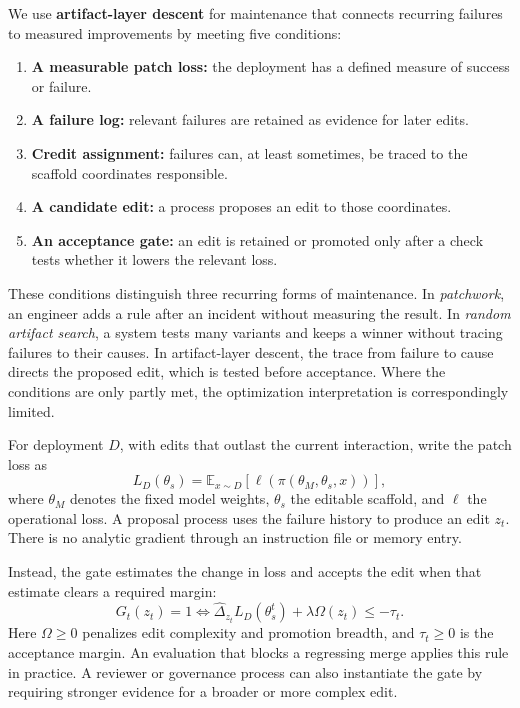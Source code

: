 \documentclass[
  11pt,
]{article}
\providecommand{\tightlist}{%
  \setlength{\itemsep}{0pt}\setlength{\parskip}{0pt}}
\begin{document}
We use \textbf{artifact-layer descent} for maintenance that connects recurring failures to measured improvements by meeting five conditions:

\begin{enumerate}
\def\labelenumi{\arabic{enumi}.}
\tightlist
\item
  \textbf{A measurable patch loss:} the deployment has a defined measure of success or failure.
\item
  \textbf{A failure log:} relevant failures are retained as evidence for later edits.
\item
  \textbf{Credit assignment:} failures can, at least sometimes, be traced to the scaffold coordinates responsible.
\item
  \textbf{A candidate edit:} a process proposes an edit to those coordinates.
\item
  \textbf{An acceptance gate:} an edit is retained or promoted only after a check tests whether it lowers the relevant loss.
\end{enumerate}

These conditions distinguish three recurring forms of maintenance. In \emph{patchwork}, an engineer adds a rule after an incident without measuring the result. In \emph{random artifact search}, a system tests many variants and keeps a winner without tracing failures to their causes. In artifact-layer descent, the trace from failure to cause directs the proposed edit, which is tested before acceptance. Where the conditions are only partly met, the optimization interpretation is correspondingly limited.

For deployment \(D\), with edits that outlast the current interaction, write the patch loss as \[L_D(\theta_s)=\mathbb{E}_{x\sim D}\!\left[\ell(\pi(\theta_M,\theta_s,x))\right],\] where \(\theta_M\) denotes the fixed model weights, \(\theta_s\) the editable scaffold, and \(\ell\) the operational loss. A proposal process uses the failure history to produce an edit \(z_t\). There is no analytic gradient through an instruction file or memory entry.

Instead, the gate estimates the change in loss and accepts the edit when that estimate clears a required margin: \[G_t(z_t)=1\iff\widehat{\Delta}_{z_t}L_D(\theta_s^t)+\lambda\Omega(z_t)\leq-\tau_t.\] Here \(\Omega\geq0\) penalizes edit complexity and promotion breadth, and \(\tau_t\geq0\) is the acceptance margin. An evaluation that blocks a regressing merge applies this rule in practice. A reviewer or governance process can also instantiate the gate by requiring stronger evidence for a broader or more complex edit.
\end{document}
